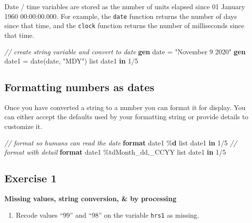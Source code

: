 \documentclass[
]{book}
\newenvironment{Shaded}{\begin{snugshade}}{\end{snugshade}}
\newcommand{\CommentTok}[1]{\textcolor[rgb]{0.56,0.35,0.01}{\textit{#1}}}
\newcommand{\FunctionTok}[1]{\textcolor[rgb]{0.00,0.00,0.00}{#1}}
\newcommand{\KeywordTok}[1]{\textcolor[rgb]{0.13,0.29,0.53}{\textbf{#1}}}
\newcommand{\NormalTok}[1]{#1}
\newcommand{\OtherTok}[1]{\textcolor[rgb]{0.56,0.35,0.01}{#1}}
\newcommand{\StringTok}[1]{\textcolor[rgb]{0.31,0.60,0.02}{#1}}
\providecommand{\tightlist}{%
  \setlength{\itemsep}{0pt}\setlength{\parskip}{0pt}}
\begin{document}
Date / time variables are stored as the number of units elapsed since 01 January 1960 00:00:00.000. For example, the \texttt{date} function returns the number of days since that time, and the \texttt{clock} function returns the number of milliseconds since that time.

\begin{Shaded}
\begin{Highlighting}[]
\CommentTok{// create string variable and convert to date}
\KeywordTok{gen} \FunctionTok{date}\NormalTok{ = }\StringTok{"November 9 2020"}
\KeywordTok{gen}\NormalTok{ date1 = }\FunctionTok{date}\NormalTok{(}\FunctionTok{date}\NormalTok{, }\StringTok{"MDY"}\NormalTok{)}
\OtherTok{list}\NormalTok{ date1 }\KeywordTok{in}\NormalTok{ 1/5}
\end{Highlighting}
\end{Shaded}

\hypertarget{formatting-numbers-as-dates}{%
\subsection{Formatting numbers as dates}\label{formatting-numbers-as-dates}}

Once you have converted a string to a number you can format it for display. You can either accept the defaults used by your formatting string or provide details to customize it.

\begin{Shaded}
\begin{Highlighting}[]
\CommentTok{// format so humans can read the date}
\KeywordTok{format}\NormalTok{ date1 \%}\KeywordTok{d}
\OtherTok{list}\NormalTok{ date1 }\KeywordTok{in}\NormalTok{ 1/5}
\CommentTok{// format with detail}
\KeywordTok{format}\NormalTok{ date1 \%tdMonth\_dd,\_CCYY}
\OtherTok{list}\NormalTok{ date1 }\KeywordTok{in}\NormalTok{ 1/5}
\end{Highlighting}
\end{Shaded}

\hypertarget{exercise-1-7}{%
\subsection{Exercise 1}\label{exercise-1-7}}

\textbf{Missing values, string conversion, \& by processing}

\begin{enumerate}
\def\labelenumi{\arabic{enumi}.}
\tightlist
\item
  Recode values ``99'' and ``98'' on the variable \texttt{hrs1} as missing.
\end{enumerate}
\end{document}
